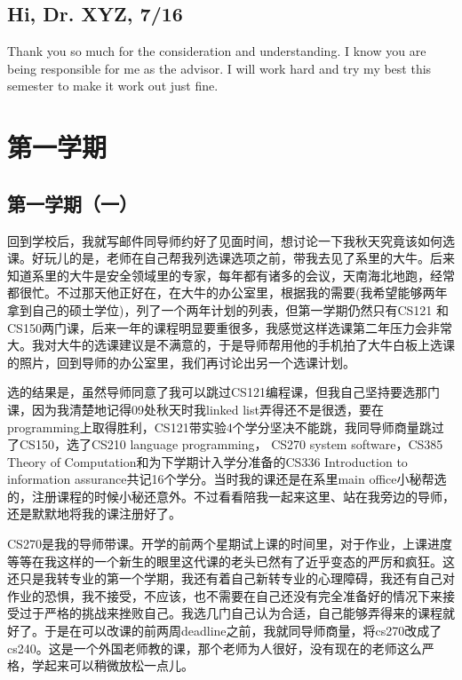 \documentclass[12pt]{book}
\begin{document}
\section{Hi, Dr. XYZ,   7/16}
\label{sec-2-9}

Thank you so much for the consideration and understanding. I know you are being responsible for me as the advisor.
I will work hard and try my best this semester to make it work out just fine.

\chapter{第一学期}
\label{sec-3}
\section{第一学期（一）}
\label{sec-3-1}
回到学校后，我就写邮件同导师约好了见面时间，想讨论一下我秋天究竟该如何选课。好玩儿的是，老师在自己帮我列选课选项之前，带我去见了系里的大牛。后来知道系里的大牛是安全领域里的专家，每年都有诸多的会议，天南海北地跑，经常都很忙。不过那天他正好在，在大牛的办公室里，根据我的需要(我希望能够两年拿到自己的硕士学位)，列了一个两年计划的列表，但第一学期仍然只有CS121 和CS150两门课，后来一年的课程明显要重很多，我感觉这样选课第二年压力会非常大。我对大牛的选课建议是不满意的，于是导师帮用他的手机拍了大牛白板上选课的照片，回到导师的办公室里，我们再讨论出另一个选课计划。

选的结果是，虽然导师同意了我可以跳过CS121编程课，但我自己坚持要选那门课，因为我清楚地记得09处秋天时我linked list弄得还不是很透，要在programming上取得胜利，CS121带实验4个学分坚决不能跳，我同导师商量跳过了CS150，选了CS210 language programming， CS270 system software，CS385 Theory of Computation和为下学期计入学分准备的CS336 Introduction to information assurance共记16个学分。当时我的课还是在系里main office小秘帮选的，注册课程的时候小秘还意外。不过看看陪我一起来这里、站在我旁边的导师，还是默默地将我的课注册好了。

CS270是我的导师带课。开学的前两个星期试上课的时间里，对于作业，上课进度等等在我这样的一个新生的眼里这代课的老头已然有了近乎变态的严厉和疯狂。这还只是我转专业的第一个学期，我还有着自己新转专业的心理障碍，我还有自己对作业的恐惧，我不接受，不应该，也不需要在自己还没有完全准备好的情况下来接受过于严格的挑战来挫败自己。我选几门自己认为合适，自己能够弄得来的课程就好了。于是在可以改课的前两周deadline之前，我就同导师商量，将cs270改成了cs240。这是一个外国老师教的课，那个老师为人很好，没有现在的老师这么严格，学起来可以稍微放松一点儿。
\end{document}
